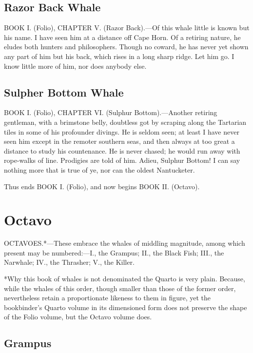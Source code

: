 \subsection{Razor Back Whale}

BOOK I. (Folio), CHAPTER V. (Razor Back).—Of this whale little is known but his name. I have seen him at a distance off Cape Horn. Of a retiring nature, he eludes both hunters and philosophers. Though no coward, he has never yet shown any part of him but his back, which rises in a long sharp ridge. Let him go. I know little more of him, nor does anybody else.

\subsection{Sulpher Bottom Whale}

BOOK I. (Folio), CHAPTER VI. (Sulphur Bottom).—Another retiring gentleman, with a brimstone belly, doubtless got by scraping along the Tartarian tiles in some of his profounder divings. He is seldom seen; at least I have never seen him except in the remoter southern seas, and then always at too great a distance to study his countenance. He is never chased; he would run away with rope-walks of line. Prodigies are told of him. Adieu, Sulphur Bottom! I can say nothing more that is true of ye, nor can the oldest Nantucketer.

Thus ends BOOK I. (Folio), and now begins BOOK II. (Octavo).

\section{Octavo}

OCTAVOES.*—These embrace the whales of middling magnitude, among which present may be numbered:—I., the Grampus; II., the Black Fish; III., the Narwhale; IV., the Thrasher; V., the Killer.

*Why this book of whales is not denominated the Quarto is very plain. Because, while the whales of this order, though smaller than those of the former order, nevertheless retain a proportionate likeness to them in figure, yet the bookbinder’s Quarto volume in its dimensioned form does not preserve the shape of the Folio volume, but the Octavo volume does.

\subsection{Grampus}

